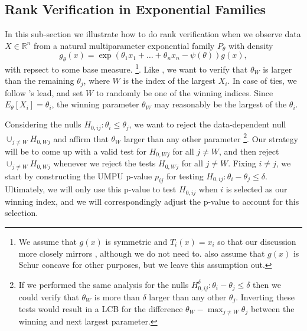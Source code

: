 \documentclass{article}
\newcommand{\R}{\mathbb{R}}
\begin{document}
\subsection{Rank Verification in Exponential Families}

In this sub-section we illustrate how to do rank verification when we observe data $X \in \R^n$ from a natural multiparameter exponential family $P_{\theta}$ with density
\begin{equation}
    \label{eq:exp_fam}
    g_{\theta}(x) = \exp(\theta_1 x_1 + \dots + \theta_n x_n - \psi(\theta))g(x),
\end{equation}
with repsect to some base measure. \footnote{We assume that $g(x)$ is symmetric and $T_i(x) = x_i$ so that our discussion more closely mirrors \cite{Hung2019}, although we do not need to. \cite{Hung2019} also assume that $g(x)$ is Schur concave for other purposes, but we leave this assumption out.}. Like \cite{Hung2019}, we want to verify that $\theta_W$ is larger than the remaining $\theta_j$, where $W$ is the index of the largest $X_i$. In case of ties, we follow \cite{Hung2019}'s lead, and set $W$ to randomly be one of the winning indices. Since $E_{\theta}[X_i] = \theta_i$, the winning parameter $\theta_W$ may reasonably be the largest of the $\theta_i$. 

Considering the nulls $H_{0, ij} : \theta_i \leq \theta_j$, we want to reject the data-dependent null $\cup_{j \neq W} H_{0, Wj} $ and affirm that $\theta_W$ larger than any other parameter \footnote{If we performed the same analysis for the nulls $H^{\delta}_{0, ij} : \theta_i  - \theta_j \leq \delta$ then we could verify that $\theta_W$ is more than $\delta$ larger than any other $\theta_j$. Inverting these tests would result in a LCB for the difference $\theta_W - \max_{j \neq W } \theta_j$ between the winning and next largest parameter.}. Our strategy will be to come up with a valid test for $H_{0, Wj}$ for all $j \neq W$, and then reject $\cup_{j \neq W} H_{0, Wj}$ whenever we reject the tests $H_{0, Wj}$ for all $j \neq W$. Fixing $i \neq j$, we start by constructing the UMPU p-value $p_{ij}$ for testing $H_{0, ij}: \theta_i - \theta_j \leq \delta$. Ultimately, we will only use this p-value to test $H_{0, ij}$ when $i$ is selected as our winning index, and we will correspondingly adjust the p-value to account for this selection. 
\end{document}

